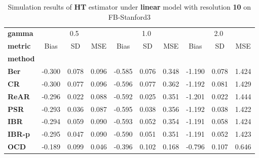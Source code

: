 \begin{table}
\centering
\caption{Simulation results of \textbf{HT} estimator under \textbf{linear} model with resolution \textbf{10} on FB-Stanford3}
\begin{tabular}{lccccccccc}
\toprule
\textbf{gamma} & \multicolumn{3}{c}{0.5} & \multicolumn{3}{c}{1.0} & \multicolumn{3}{c}{2.0} \\
\textbf{metric} &   Bias &     SD &    MSE &   Bias &     SD &    MSE &   Bias &     SD &    MSE \\
\textbf{method} &        &        &        &        &        &        &        &        &        \\
\midrule
\textbf{Ber} & -0.300 &  0.078 &  0.096 & -0.585 &  0.076 &  0.348 & -1.190 &  0.078 &  1.424 \\
\textbf{CR} & -0.300 &  0.077 &  0.096 & -0.596 &  0.077 &  0.362 & -1.192 &  0.081 &  1.429 \\
\textbf{ReAR} & -0.296 &  0.022 &  0.088 & -0.592 &  0.025 &  0.351 & -1.201 &  0.022 &  1.444 \\
\textbf{PSR} & -0.293 &  0.036 &  0.087 & -0.595 &  0.038 &  0.356 & -1.192 &  0.038 &  1.422 \\
\textbf{IBR} & -0.294 &  0.059 &  0.090 & -0.593 &  0.052 &  0.354 & -1.191 &  0.058 &  1.424 \\
\textbf{IBR-p} & -0.295 &  0.047 &  0.090 & -0.590 &  0.051 &  0.351 & -1.191 &  0.052 &  1.423 \\
\textbf{OCD} & -0.189 &  0.099 &  0.046 & -0.396 &  0.102 &  0.168 & -0.796 &  0.107 &  0.646 \\
\bottomrule
\end{tabular}
\end{table}
